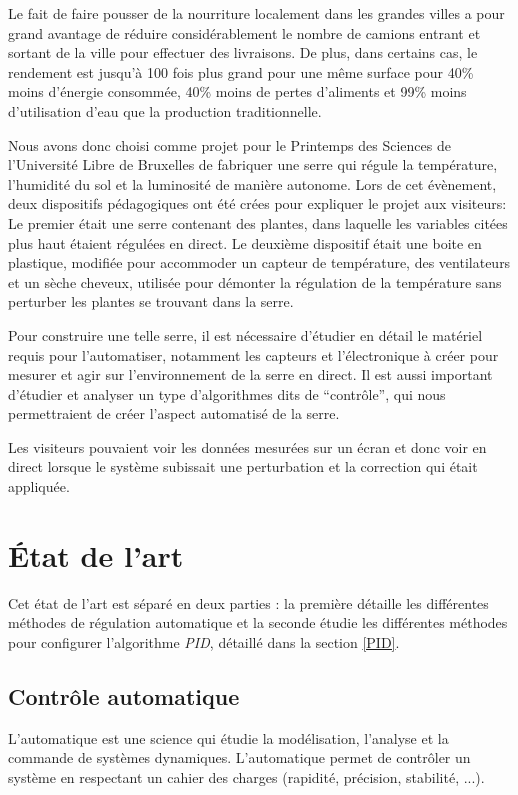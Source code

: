 \documentclass[a4paper,10pt]{report}
\begin{document}
Le fait de faire pousser de la nourriture localement dans les grandes villes a pour grand avantage de réduire considérablement le nombre de camions entrant et sortant de la ville pour effectuer des livraisons. De plus, dans certains cas, le rendement est jusqu'à 100 fois plus grand pour une même surface pour 40\% moins d'énergie consommée, 40\% moins de pertes d'aliments et 99\% moins d'utilisation d'eau que la production traditionnelle. \cite{GEReports}

Nous avons donc choisi comme projet pour le Printemps des Sciences de l'Université Libre de Bruxelles de fabriquer une serre qui régule la température, l'humidité du sol et la luminosité de manière autonome. Lors de cet évènement, deux dispositifs pédagogiques ont été crées pour expliquer le projet aux visiteurs: Le premier était une serre contenant des plantes, dans laquelle les variables citées plus haut étaient régulées en direct. Le deuxième dispositif était une boite en plastique, modifiée pour accommoder un capteur de température, des ventilateurs et un sèche cheveux, utilisée pour démonter la régulation de la température sans perturber les plantes se trouvant dans la serre.

Pour construire une telle serre, il est nécessaire d'étudier en détail le matériel requis pour l'automatiser, notamment les capteurs et l'électronique à créer pour mesurer et agir sur l'environnement de la serre en direct.
Il est aussi important d'étudier et analyser un type d'algorithmes dits de ``contrôle'', qui nous permettraient de créer l'aspect automatisé de la serre.

Les visiteurs pouvaient voir les données mesurées sur un écran et donc voir en direct lorsque le système subissait une perturbation et la correction qui était appliquée.

\chapter{État de l'art}

Cet état de l'art est séparé en deux parties : la première détaille les différentes méthodes de régulation automatique et la seconde étudie les différentes méthodes pour configurer l'algorithme \emph{PID}, détaillé dans la section \ref{PID}.

\section{Contrôle automatique}
L’automatique est une science qui étudie la modélisation, l’analyse et la commande de systèmes dynamiques.
L’automatique permet de contrôler un système en respectant un cahier des charges (rapidité, précision, stabilité, ...).
\end{document}
